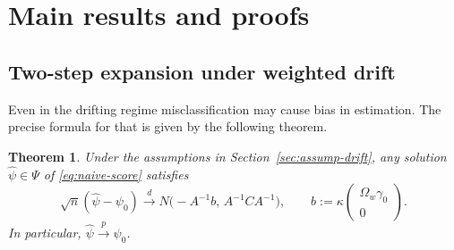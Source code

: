 \documentclass[11pt]{article}
\newtheorem{theorem}{Theorem}
\theoremstyle{definition}
\theoremstyle{remark}
\newcommand{\toP}{\xrightarrow{\,p\,}}
\newcommand{\tod}{\xrightarrow{\,d\,}}
\begin{document}
\section{Main results and proofs}

\subsection{Two-step expansion under weighted drift}\label{sec:drift-theorem}
Even in the drifting regime misclassification may cause bias in estimation. The precise formula for that is given by the following theorem.

\begin{theorem}\label{thm:twostep}
Under the assumptions in Section~\ref{sec:assump-drift}, any solution $\hat\psi\in \Psi$ of \eqref{eq:naive-score} satisfies
\begin{equation}
\sqrt{n}(\hat\psi-\psi_0)\tod N\Big(-A^{-1}b,\,A^{-1}CA^{-1}\Big),\qquad b:=\kappa\begin{pmatrix}\Omega_w\gamma_0\\ 0\end{pmatrix}.
\label{eq:twostep-limit}
\end{equation}
In particular, $\hat\psi\toP\psi_0$.
\end{theorem}
\end{document}
